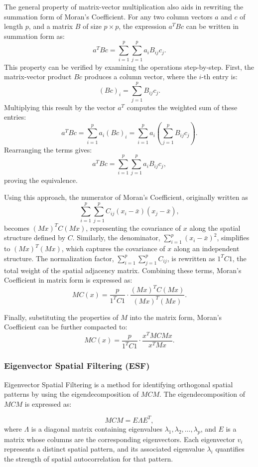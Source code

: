 \documentclass[12pt]{article}
\begin{document}
The general property of matrix-vector multiplication also aids in rewriting the summation form of Moran's Coefficient. For any two column vectors \( a \) and \( c \) of length \( p \), and a matrix \( B \) of size \( p \times p \), the expression \( a^T B c \) can be written in summation form as:
\[
  a^T B c = \sum_{i=1}^p \sum_{j=1}^p a_i B_{ij} c_j.
\]
This property can be verified by examining the operations step-by-step. First, the matrix-vector product \( Bc \) produces a column vector, where the \( i \)-th entry is:
\[
  (Bc)_i = \sum_{j=1}^p B_{ij} c_j.
\]
Multiplying this result by the vector \( a^T \) computes the weighted sum of these entries:
\[
  a^T B c = \sum_{i=1}^p a_i (Bc)_i = \sum_{i=1}^p a_i \left( \sum_{j=1}^p B_{ij} c_j \right).
\]
Rearranging the terms gives:
\[
  a^T B c = \sum_{i=1}^p \sum_{j=1}^p a_i B_{ij} c_j,
\]
proving the equivalence.

Using this approach, the numerator of Moran's Coefficient, originally written as 
\[
  \sum_{i=1}^p \sum_{j=1}^p C_{ij} (x_i - \bar{x})(x_j - \bar{x}),
\]
becomes \( (Mx)^T C (Mx) \), representing the covariance of \( x \) along the spatial structure defined by \( C \). Similarly, the denominator, \( \sum_{i=1}^p (x_i - \bar{x})^2 \), simplifies to \( (Mx)^T (Mx) \), which captures the covariance of \( x \) along an independent structure. The normalization factor, \( \sum_{i=1}^p \sum_{j=1}^p C_{ij} \), is rewritten as \( 1^T C 1 \), the total weight of the spatial adjacency matrix. Combining these terms, Moran’s Coefficient in matrix form is expressed as: 
\[
  MC(x) = \frac{p}{1^T C 1} \cdot \frac{(Mx)^T C (Mx)}{(Mx)^T (Mx)}.
\]

Finally, substituting the properties of \( M \) into the matrix form, Moran’s Coefficient can be further compacted to:
\[
  MC(x) = \frac{p}{1^T C 1} \cdot \frac{x^T M C M x}{x^T M x}.
\]


\subsubsection{Eigenvector Spatial Filtering (ESF)}

Eigenvector Spatial Filtering is a method for identifying orthogonal spatial patterns by using the eigendecomposition of \( MCM \). The eigendecomposition of \( MCM \) is expressed as:

\[
  MCM = E \Lambda E^T,
\]
where \( \Lambda \) is a diagonal matrix containing eigenvalues \( \lambda_1, \lambda_2, \ldots, \lambda_p \), and \( E \) is a matrix whose columns are the corresponding eigenvectors. Each eigenvector \( v_i \) represents a distinct spatial pattern, and its associated eigenvalue \( \lambda_i \) quantifies the strength of spatial autocorrelation for that pattern.
\end{document}
